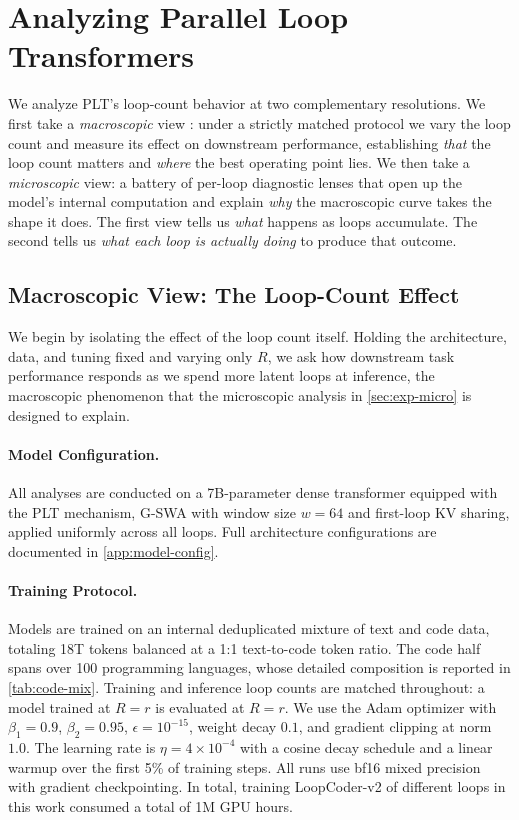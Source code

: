 \documentclass{llmxive}
\providecommand{\loopcount}{R}
\providecommand{\modelname}{LoopCoder-v2}
\begin{document}
\section{Analyzing Parallel Loop Transformers}
\label{sec:experiments}

We analyze PLT's loop-count behavior at two complementary resolutions.
We first take a \emph{macroscopic} view : under a
strictly matched protocol we vary the loop count and measure its effect on
downstream performance, establishing \emph{that} the loop count matters and
\emph{where} the best operating point lies.
We then take a \emph{microscopic} view: a battery
of per-loop diagnostic lenses that open up the model's internal computation and
explain \emph{why} the macroscopic curve takes the shape it does.
The first view tells us \emph{what} happens as loops accumulate. The second
tells us \emph{what each loop is actually doing} to produce that outcome.

\subsection{Macroscopic View: The Loop-Count Effect}
\label{sec:exp-macro}

We begin by isolating the effect of the loop count itself.
Holding the architecture, data, and tuning fixed and varying only
$\loopcount$, we ask how downstream task performance responds as we spend more
latent loops at inference, the macroscopic phenomenon that the microscopic
analysis in \autoref{sec:exp-micro} is designed to explain.

\paragraph{Model Configuration.}
\label{sec:exp-arch}

All analyses are conducted on a 7B-parameter dense transformer
equipped with the PLT mechanism, G-SWA with window size $w = 64$ and
first-loop KV sharing, applied uniformly across all loops.
Full architecture configurations are documented in
\autoref{app:model-config}.

\paragraph{Training Protocol.}
\label{sec:exp-train}

Models are trained on an internal deduplicated mixture of text and code
data, totaling 18T tokens balanced at a 1:1 text-to-code token ratio. The
code half spans over 100 programming languages, whose detailed composition is
reported in \autoref{tab:code-mix}.
Training and inference loop counts are matched throughout: a model
trained at $\loopcount = r$ is evaluated at $\loopcount = r$.
We use the Adam optimizer with $\beta_1 = 0.9$, $\beta_2 = 0.95$,
$\epsilon = 10^{-15}$, weight decay $0.1$, and gradient clipping at
norm $1.0$.
The learning rate is $\eta = 4 \times 10^{-4}$ with a cosine decay
schedule and a linear warmup over the first 5\% of training steps.
All runs use bf16 mixed precision with gradient checkpointing.
In total, training \modelname{} of different loops in this work consumed a total of 1M GPU hours.
\end{document}
